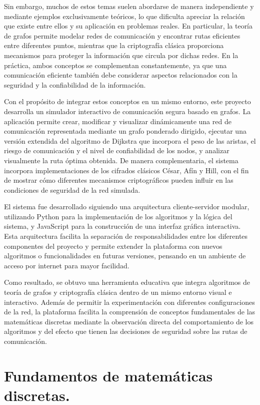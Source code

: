 \documentclass[conference]{IEEEtran}
\begin{document}
Sin embargo, muchos de estos temas suelen abordarse de manera independiente y mediante ejemplos exclusivamente teóricos, lo que dificulta apreciar la relación que existe entre ellos y su aplicación en problemas reales. En particular, la teoría de grafos permite modelar redes de comunicación y encontrar rutas eficientes entre diferentes puntos, mientras que la criptografía clásica proporciona mecanismos para proteger la información que circula por dichas redes. En la práctica, ambos conceptos se complementan constantemente, ya que una comunicación eficiente también debe considerar aspectos relacionados con la seguridad y la confiabilidad de la información.

Con el propósito de integrar estos conceptos en un mismo entorno, este proyecto desarrolla un simulador interactivo de comunicación segura basado en grafos. La aplicación permite crear, modificar y visualizar dinámicamente una red de comunicación representada mediante un grafo ponderado dirigido, ejecutar una versión extendida del algoritmo de Dijkstra que incorpora el peso de las aristas, el riesgo de comunicación y el nivel de confiabilidad de los nodos, y analizar visualmente la ruta óptima obtenida. De manera complementaria, el sistema incorpora implementaciones de los cifrados clásicos César, Afín y Hill, con el fin de mostrar cómo diferentes mecanismos criptográficos pueden influir en las condiciones de seguridad de la red simulada.

El sistema fue desarrollado siguiendo una arquitectura cliente-servidor modular, utilizando Python para la implementación de los algoritmos y la lógica del sistema, y JavaScript para la construcción de una interfaz gráfica interactiva. Esta arquitectura facilita la separación de responsabilidades entre los diferentes componentes del proyecto y permite extender la plataforma con nuevos algoritmos o funcionalidades en futuras versiones, pensando en un ambiente de acceso por internet para mayor facilidad.

Como resultado, se obtuvo una herramienta educativa que integra algoritmos de teoría de grafos y criptografía clásica dentro de un mismo entorno visual e interactivo. Además de permitir la experimentación con diferentes configuraciones de la red, la plataforma facilita la comprensión de conceptos fundamentales de las matemáticas discretas mediante la observación directa del comportamiento de los algoritmos y del efecto que tienen las decisiones de seguridad sobre las rutas de comunicación.


\section{Fundamentos de matemáticas discretas.}
\end{document}
